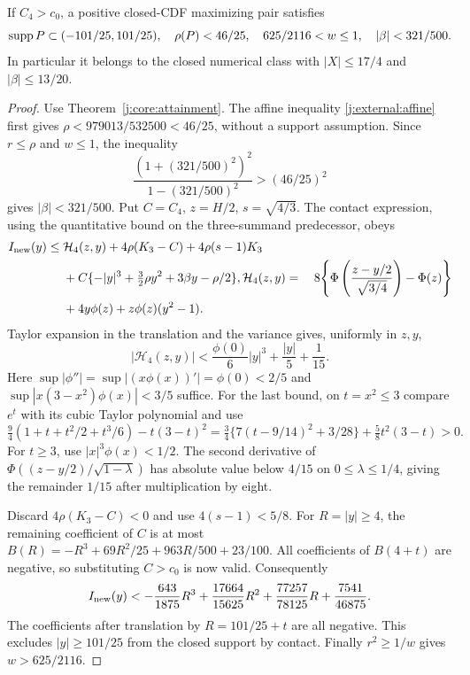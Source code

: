 \begin{proposition}\label{j:finite:n4-localization}
If $C_4>c_0$, a positive closed-CDF maximizing pair satisfies
\[
 \operatorname{supp} P\subset(-101/25,101/25),\quad\rho(P)<46/25,
 \quad 625/2116<w\le1,\quad|\beta|<321/500.
\]
In particular it belongs to the closed numerical class with
$|X|\le17/4$ and $|\beta|\le13/20$.
\end{proposition}
\begin{proof}
Use Theorem~\ref{j:core:attainment}.  The affine inequality
\eqref{j:external:affine} first gives
$\rho<979013/532500<46/25$, without a support assumption.
Since $r\le\rho$ and $w\le1$, the inequality
\[
 \frac{(1+(321/500)^2)^2}{1-(321/500)^2}>(46/25)^2
\]
gives $|\beta|<321/500$.
Put $C=C_4$, $z=H/2$, $s=\sqrt{4/3}$.  The contact expression,
using the quantitative bound on the three-summand predecessor, obeys
\begin{align*}
 I_{\rm new}(y)\le{}&\mathcal H_4(z,y)+4\rho(K_3-C)
                    +4\rho(s-1)K_3\\
 &+C\{-|y|^3+\tfrac32\rho y^2+3\beta y-\rho/2\},
\mathcal H_4(z,y)={}&8\!\left\{\Phi\left(\frac{z-y/2}{\sqrt{3/4}}\right)-\Phi(z)\right\}
                 \\
 &+4y\phi(z)+z\phi(z)(y^2-1).
\end{align*}
Taylor expansion in the translation and the variance gives, uniformly
in $z,y$,
\[
 |\mathcal H_4(z,y)|<\frac{\phi(0)}6|y|^3+\frac{|y|}{5}+\frac1{15}.
\]
Here $\sup|\phi''|=\sup|(x\phi(x))'|=\phi(0)<2/5$ and
$\sup|x(3-x^2)\phi(x)|<3/5$ suffice.  For the last bound, on
$t=x^2\le3$ compare $e^t$ with its cubic Taylor polynomial and use
\[
 \tfrac94(1+t+t^2/2+t^3/6)-t(3-t)^2
 =\tfrac34\{7(t-9/14)^2+3/28\}+\tfrac58t^2(3-t)>0.
\]
For $t\ge3$, use $|x|^3\phi(x)<1/2$.
The second derivative of
$\Phi((z-y/2)/\sqrt{1-\lambda})$ has absolute value below $4/15$
on $0\le\lambda\le1/4$, giving the remainder $1/15$ after
multiplication by eight.

Discard $4\rho(K_3-C)<0$ and use $4(s-1)<5/8$.
For $R=|y|\ge4$, the remaining coefficient of $C$ is at most
$B(R)=-R^3+69R^2/25+963R/500+23/100$.
All coefficients of $B(4+t)$ are negative, so substituting $C>c_0$
is now valid.  Consequently
\[
 I_{\rm new}(y)<-\frac{643}{1875}R^3+
 \frac{17664}{15625}R^2+\frac{77257}{78125}R+\frac{7541}{46875}.
\]
The coefficients after translation by $R=101/25+t$ are all negative.
This excludes $|y|\ge101/25$ from the closed support by contact.
Finally $r^2\ge1/w$ gives $w>625/2116$.
\end{proof}



